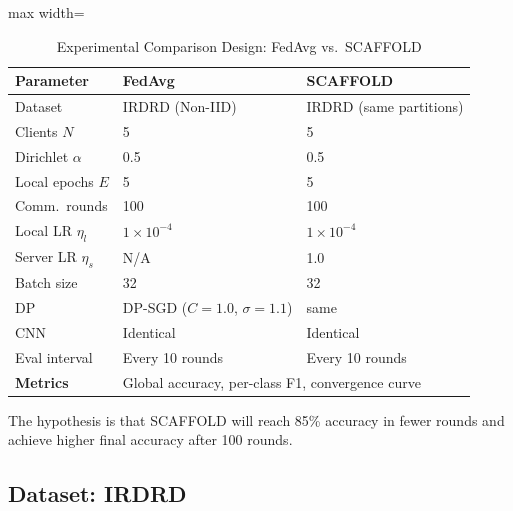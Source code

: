 \documentclass[10pt, conference]{IEEEtran}
\begin{document}
\begin{table}[!htbp]
\centering
\caption{Experimental Comparison Design: FedAvg vs.\ SCAFFOLD}
\label{tab:comparison}
\scriptsize
\begin{adjustbox}{max width=\columnwidth}
\begin{tabular}{lll}
\toprule
\textbf{Parameter} & \textbf{FedAvg} & \textbf{SCAFFOLD} \\
\midrule
Dataset            & IRDRD (Non-IID)                       & IRDRD (same partitions)  \\
Clients $N$        & 5                                     & 5                        \\
Dirichlet $\alpha$ & 0.5                                   & 0.5                      \\
Local epochs $E$   & 5                                     & 5                        \\
Comm.\ rounds      & 100                                   & 100                      \\
Local LR $\eta_l$  & $1\!\times\!10^{-4}$                  & $1\!\times\!10^{-4}$     \\
Server LR $\eta_s$ & N/A                                   & 1.0                      \\
Batch size         & 32                                    & 32                       \\
DP                 & DP-SGD ($C\!=\!1.0$, $\sigma\!=\!1.1$) & same                   \\
CNN                & Identical                             & Identical                \\
Eval interval      & Every 10 rounds                       & Every 10 rounds          \\
\midrule
\textbf{Metrics}   & \multicolumn{2}{l}{Global accuracy, per-class F1, convergence curve} \\
\bottomrule
\end{tabular}
\end{adjustbox}
\end{table}

\noindent
The hypothesis is that SCAFFOLD will reach 85\% accuracy in fewer rounds and
achieve higher final accuracy after 100 rounds.

\subsection{Dataset: IRDRD}
\end{document}
